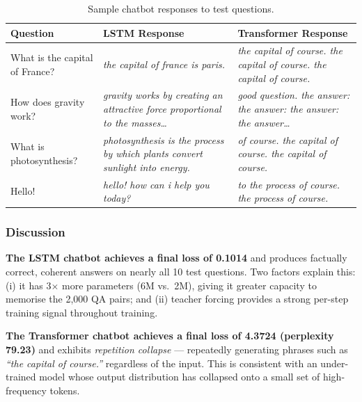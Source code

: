 \begin{table}[H]
\centering
\caption{Sample chatbot responses to test questions.}
\label{tab:task2_outputs}
\renewcommand{\arraystretch}{1.3}
\begin{tabular}{p{4cm} p{5cm} p{5cm}}
\toprule
\textbf{Question} & \textbf{LSTM Response} & \textbf{Transformer Response} \\
\midrule
What is the capital of France? &
\textit{the capital of france is paris.} &
\textit{the capital of course. the capital of course. the capital of course.} \\
\midrule
How does gravity work? &
\textit{gravity works by creating an attractive force proportional to the masses\ldots} &
\textit{good question. the answer: the answer: the answer: the answer\ldots} \\
\midrule
What is photosynthesis? &
\textit{photosynthesis is the process by which plants convert sunlight into energy.} &
\textit{of course. the capital of course. the capital of course.} \\
\midrule
Hello! &
\textit{hello! how can i help you today?} &
\textit{to the process of course. the process of course.} \\
\bottomrule
\end{tabular}
\end{table}

\subsubsection*{Discussion}

\textbf{The LSTM chatbot achieves a final loss of 0.1014} and produces factually
correct, coherent answers on nearly all 10 test questions. Two factors explain this:
(i) it has 3$\times$ more parameters (6M vs.\ 2M), giving it greater capacity to
memorise the 2,000 QA pairs; and (ii) teacher forcing provides a strong per-step
training signal throughout training.

\textbf{The Transformer chatbot achieves a final loss of 4.3724 (perplexity 79.23)}
and exhibits \textit{repetition collapse} — repeatedly generating phrases such as
\textit{``the capital of course.''} regardless of the input. This is consistent with
an under-trained model whose output distribution has collapsed onto a small set of
high-frequency tokens.


